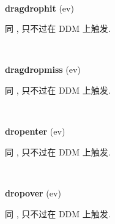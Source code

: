 \documentclass[letterpaper,10pt,english]{sphinxmanual}
\begin{document}

\begin{fulllineitems}
\label{api/component/dd/ddm:DDM.dragdrophit}~
\begin{DUlineblock}{0em}
\item[] \textbf{dragdrophit} (ev)
\item[] 同 {\hyperref[api/component/dd/draggable:Draggable.dragdrophit]{}} , 只不过在 DDM 上触发.
\end{DUlineblock}

\end{fulllineitems}



\begin{fulllineitems}
\label{api/component/dd/ddm:DDM.dragdropmiss}~
\begin{DUlineblock}{0em}
\item[] \textbf{dragdropmiss} (ev)
\item[] 同 {\hyperref[api/component/dd/draggable:Draggable.dragdropmiss]{}} , 只不过在 DDM 上触发.
\end{DUlineblock}

\end{fulllineitems}



\begin{fulllineitems}
\label{api/component/dd/ddm:DDM.dropenter}~
\begin{DUlineblock}{0em}
\item[] \textbf{dropenter} (ev)
\item[] 同 {\hyperref[api/component/dd/droppable:Droppable.dropenter]{}} , 只不过在 DDM 上触发.
\end{DUlineblock}

\end{fulllineitems}



\begin{fulllineitems}
\label{api/component/dd/ddm:DDM.dropover}~
\begin{DUlineblock}{0em}
\item[] \textbf{dropover} (ev)
\item[] 同 {\hyperref[api/component/dd/droppable:Droppable.dropover]{}} , 只不过在 DDM 上触发.
\end{DUlineblock}

\end{fulllineitems}
\end{document}
